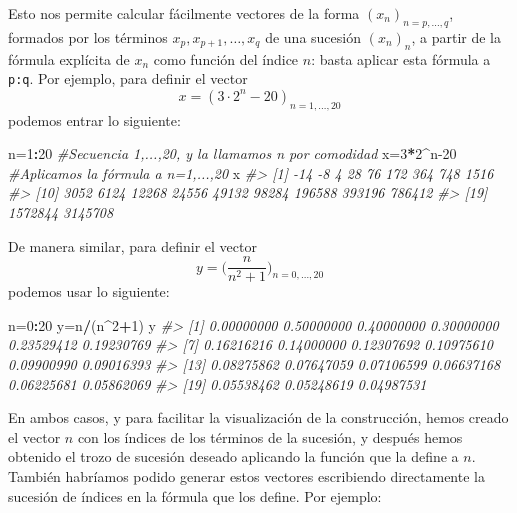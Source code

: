 \documentclass[
]{book}
\newenvironment{Shaded}{\begin{snugshade}}{\end{snugshade}}
\newcommand{\CommentTok}[1]{\textcolor[rgb]{0.56,0.35,0.01}{\textit{#1}}}
\newcommand{\DecValTok}[1]{\textcolor[rgb]{0.00,0.00,0.81}{#1}}
\newcommand{\NormalTok}[1]{#1}
\newcommand{\OperatorTok}[1]{\textcolor[rgb]{0.81,0.36,0.00}{\textbf{#1}}}
\theoremstyle{definition}
\theoremstyle{definition}
\theoremstyle{definition}
\theoremstyle{remark}
\begin{document}
Esto nos permite calcular fácilmente vectores de la forma \((x_n)_{n=p, \ldots, q}\), formados por los términos \(x_p, x_{p+1}, \ldots, x_q\) de una sucesión \((x_n)_n\), a partir de la fórmula explícita de \(x_n\) como función del índice \(n\): basta aplicar esta fórmula a \texttt{p:q}. Por ejemplo, para definir el vector
\[
x=(3\cdot 2^n-20)_{n=1, \ldots, 20}
\]
podemos entrar lo siguiente:

\begin{Shaded}
\begin{Highlighting}[]
\NormalTok{n=}\DecValTok{1}\OperatorTok{:}\DecValTok{20} \CommentTok{\#Secuencia 1,...,20, y la llamamos n por comodidad}
\NormalTok{x=}\DecValTok{3}\OperatorTok{*}\DecValTok{2}\OperatorTok{\^{}}\NormalTok{n}\DecValTok{{-}20} \CommentTok{\#Aplicamos la fórmula a n=1,...,20}
\NormalTok{x}
\CommentTok{\#\textgreater{}  [1]     {-}14      {-}8       4      28      76     172     364     748    1516}
\CommentTok{\#\textgreater{} [10]    3052    6124   12268   24556   49132   98284  196588  393196  786412}
\CommentTok{\#\textgreater{} [19] 1572844 3145708}
\end{Highlighting}
\end{Shaded}

De manera similar, para definir el vector
\[
y=\Big(\dfrac{n}{n^2+1}\Big)_{n=0, \ldots, 20}
\]
podemos usar lo siguiente:

\begin{Shaded}
\begin{Highlighting}[]
\NormalTok{n=}\DecValTok{0}\OperatorTok{:}\DecValTok{20}
\NormalTok{y=n}\OperatorTok{/}\NormalTok{(n}\OperatorTok{\^{}}\DecValTok{2}\OperatorTok{+}\DecValTok{1}\NormalTok{)}
\NormalTok{y}
\CommentTok{\#\textgreater{}  [1] 0.00000000 0.50000000 0.40000000 0.30000000 0.23529412 0.19230769}
\CommentTok{\#\textgreater{}  [7] 0.16216216 0.14000000 0.12307692 0.10975610 0.09900990 0.09016393}
\CommentTok{\#\textgreater{} [13] 0.08275862 0.07647059 0.07106599 0.06637168 0.06225681 0.05862069}
\CommentTok{\#\textgreater{} [19] 0.05538462 0.05248619 0.04987531}
\end{Highlighting}
\end{Shaded}

En ambos casos, y para facilitar la visualización de la construcción, hemos creado el vector \(n\) con los índices de los términos de la sucesión, y después hemos obtenido el trozo de sucesión deseado aplicando la función que la define a \(n\). También habríamos podido generar estos vectores escribiendo directamente la sucesión de índices en la fórmula que los define. Por ejemplo:
\end{document}
